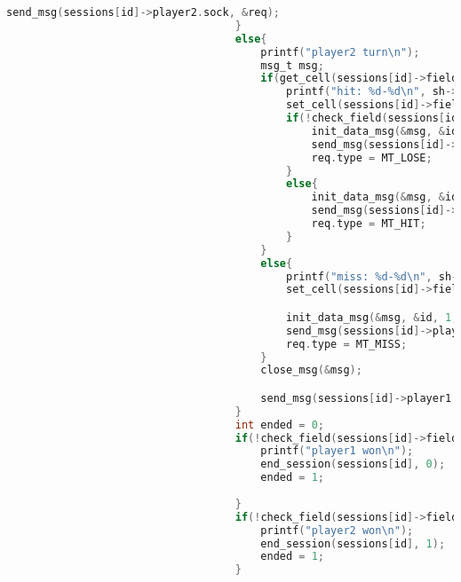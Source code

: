 \documentclass[12pt]{article}
\begin{document}
\begin{lstlisting}[language=C, basicstyle=\scriptsize]
                                        send_msg(sessions[id]->player2.sock, &req);
                                    }
                                    else{
                                        printf("player2 turn\n");
                                        msg_t msg;
                                        if(get_cell(sessions[id]->field1, sh->x, sh->y) == CL_SHIP){
                                            printf("hit: %d-%d\n", sh->x, sh->y);
                                            set_cell(sessions[id]->field1, sh->x, sh->y, CL_DESTROYED);
                                            if(!check_field(sessions[id]->field1)){
                                                init_data_msg(&msg, &id, 1, MT_WIN, id);
                                                send_msg(sessions[id]->player2.sock, &msg);
                                                req.type = MT_LOSE;
                                            }  
                                            else{
                                                init_data_msg(&msg, &id, 1, MT_HIT, id);
                                                send_msg(sessions[id]->player2.sock, &msg);
                                                req.type = MT_HIT;
                                            }
                                        }
                                        else{
                                            printf("miss: %d-%d\n", sh->x, sh->y);
                                            set_cell(sessions[id]->field1, sh->x, sh->y, CL_MISS);

                                            init_data_msg(&msg, &id, 1, MT_MISS, id);
                                            send_msg(sessions[id]->player2.sock, &msg);
                                            req.type = MT_MISS;
                                        }
                                        close_msg(&msg);

                                        send_msg(sessions[id]->player1.sock, &req);
                                    }
                                    int ended = 0;
                                    if(!check_field(sessions[id]->field2)){
                                        printf("player1 won\n");
                                        end_session(sessions[id], 0);
                                        ended = 1;
                                        
                                    }
                                    if(!check_field(sessions[id]->field1)){
                                        printf("player2 won\n");
                                        end_session(sessions[id], 1);
                                        ended = 1;
                                    }


\end{lstlisting}
\end{document}
